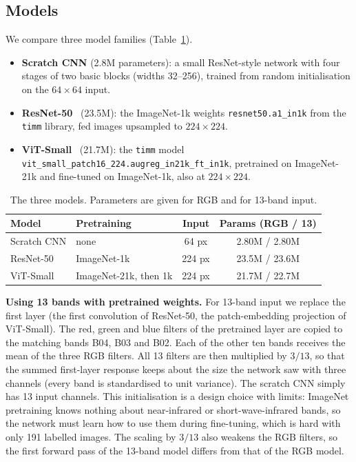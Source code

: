 \documentclass[conference]{IEEEtran}
\begin{document}
\subsection{Models}
\label{sec:models}
We compare three model families (Table~\ref{tab:models}).
\begin{itemize}
\item \textbf{Scratch CNN} (2.8M parameters): a small ResNet-style network with four stages of two basic blocks (widths 32--256), trained from random initialisation on the $64\times64$ input.
\item \textbf{ResNet-50}~\cite{he2016resnet} (23.5M): the ImageNet-1k weights \texttt{resnet50.a1\_in1k} from the \texttt{timm} library, fed images upsampled to $224\times224$.
\item \textbf{ViT-Small}~\cite{dosovitskiy2021vit} (21.7M): the \texttt{timm} model \texttt{vit\_small\_patch16\_224.}\allowbreak\texttt{augreg\_in21k\_ft\_in1k}, pretrained on ImageNet-21k and fine-tuned on ImageNet-1k, also at $224\times224$.
\end{itemize}

\begin{table}[t]
\centering
\caption{The three models. Parameters are given for RGB and for 13-band input.}
\label{tab:models}
\small
\begin{tabular}{llcc}
\toprule
Model & Pretraining & Input & Params (RGB / 13) \\
\midrule
Scratch CNN & none & 64 px & 2.80M / 2.80M \\
ResNet-50 & ImageNet-1k & 224 px & 23.5M / 23.6M \\
ViT-Small & ImageNet-21k, then 1k & 224 px & 21.7M / 22.7M \\
\bottomrule
\end{tabular}
\end{table}

\textbf{Using 13 bands with pretrained weights.} For 13-band input we replace the first layer (the first convolution of ResNet-50, the patch-embedding projection of ViT-Small). The red, green and blue filters of the pretrained layer are copied to the matching bands B04, B03 and B02. Each of the other ten bands receives the mean of the three RGB filters. All 13 filters are then multiplied by $3/13$, so that the summed first-layer response keeps about the size the network saw with three channels (every band is standardised to unit variance). The scratch CNN simply has 13 input channels. This initialisation is a design choice with limits: ImageNet pretraining knows nothing about near-infrared or short-wave-infrared bands, so the network must learn how to use them during fine-tuning, which is hard with only 191 labelled images. The scaling by $3/13$ also weakens the RGB filters, so the first forward pass of the 13-band model differs from that of the RGB model.
\end{document}
